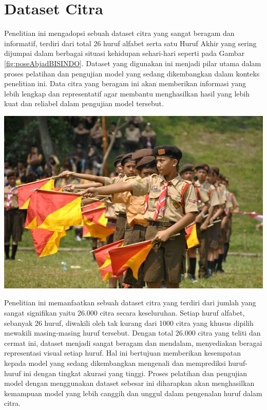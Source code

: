 \section{Dataset Citra}
Penelitian ini mengadopsi sebuah dataset citra yang sangat beragam dan informatif, terdiri dari total 26 huruf alfabet serta satu Huruf Akhir yang sering dijumpai dalam berbagai situasi kehidupan sehari-hari seperti pada Gambar \ref{fig:poseAbjadBISINDO}. Dataset yang digunakan ini menjadi pilar utama dalam proses pelatihan dan pengujian model yang sedang dikembangkan dalam konteks penelitian ini. Data citra yang beragam ini akan memberikan informasi yang lebih lengkap dan representatif agar membantu menghasilkan hasil yang lebih kuat dan reliabel dalam pengujian model tersebut.
\begin{center}
	\includegraphics[width=0.7\linewidth]{gambar/bener/kerja-semaphore.jpg}
	\label{fig:poseAbjadBISINDO}
\end{center}
Penelitian ini memanfaatkan sebuah dataset citra yang terdiri dari jumlah yang sangat signifikan yaitu 26.000 citra secara keseluruhan. Setiap huruf alfabet, sebanyak 26 huruf, diwakili oleh tak kurang dari 1000 citra yang khusus dipilih mewakili masing-masing huruf tersebut. Dengan total 26.000 citra yang teliti dan cermat ini, dataset menjadi sangat beragam dan mendalam, menyediakan beragai representasi visual setiap huruf. Hal ini bertujuan memberikan kesempatan kepada model yang sedang dikembangkan mengenali dan memprediksi huruf-huruf ini dengan tingkat akurasi yang tinggi. Proses pelatihan dan pengujian model dengan menggunakan dataset sebesar ini diharapkan akan menghasilkan kemampuan model yang lebih canggih dan unggul dalam pengenalan huruf dalam citra.

